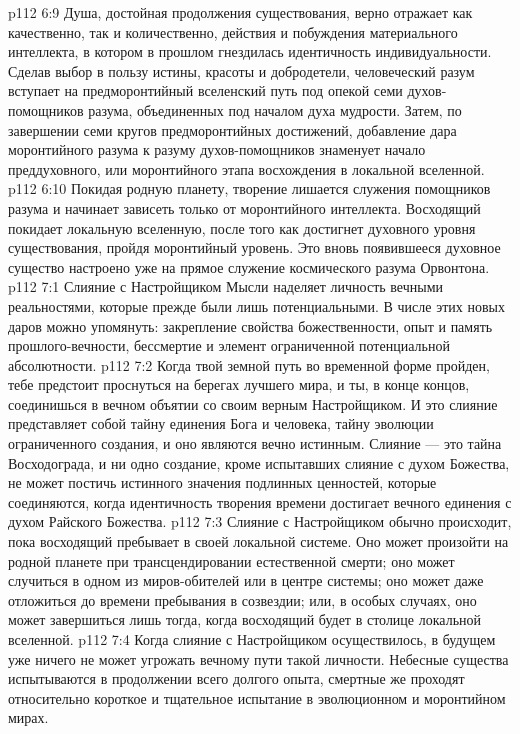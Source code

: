 \vs p112 6:9 Душа, достойная продолжения существования, верно отражает как качественно, так и количественно, действия и побуждения материального интеллекта, в котором в прошлом гнездилась идентичность индивидуальности. Сделав выбор в пользу истины, красоты и добродетели, человеческий разум вступает на предморонтийный вселенский путь под опекой семи духов\hyp{}помощников разума, объединенных под началом духа мудрости. Затем, по завершении семи кругов предморонтийных достижений, добавление дара моронтийного разума к разуму духов\hyp{}помощников знаменует начало преддуховного, или моронтийного этапа восхождения в локальной вселенной.
\vs p112 6:10 \pc Покидая родную планету, творение лишается служения помощников разума и начинает зависеть только от моронтийного интеллекта. Восходящий покидает локальную вселенную, после того как достигнет духовного уровня существования, пройдя моронтийный уровень. Это вновь появившееся духовное существо настроено уже на прямое служение космического разума Орвонтона.
\vs p112 7:1 Слияние с Настройщиком Мысли наделяет личность вечными реальностями, которые прежде были лишь потенциальными. В числе этих новых даров можно упомянуть: закрепление свойства божественности, опыт и память прошлого\hyp{}вечности, бессмертие и элемент ограниченной потенциальной абсолютности.
\vs p112 7:2 \pc Когда твой земной путь во временной форме пройден, тебе предстоит проснуться на берегах лучшего мира, и ты, в конце концов, соединишься в вечном объятии со своим верным Настройщиком. И это слияние представляет собой тайну единения Бога и человека, тайну эволюции ограниченного создания, и оно являются вечно истинным. Слияние --- это тайна Восходограда, и ни одно создание, кроме испытавших слияние с духом Божества, не может постичь истинного значения подлинных ценностей, которые соединяются, когда идентичность творения времени достигает вечного единения с духом Райского Божества.
\vs p112 7:3 Слияние с Настройщиком обычно происходит, пока восходящий пребывает в своей локальной системе. Оно может произойти на родной планете при трансцендировании естественной смерти; оно может случиться в одном из миров\hyp{}обителей или в центре системы; оно может даже отложиться до времени пребывания в созвездии; или, в особых случаях, оно может завершиться лишь тогда, когда восходящий будет в столице локальной вселенной.
\vs p112 7:4 Когда слияние с Настройщиком осуществилось, в будущем уже ничего не может угрожать вечному пути такой личности. Небесные существа испытываются в продолжении всего долгого опыта, смертные же проходят относительно короткое и тщательное испытание в эволюционном и моронтийном мирах.
